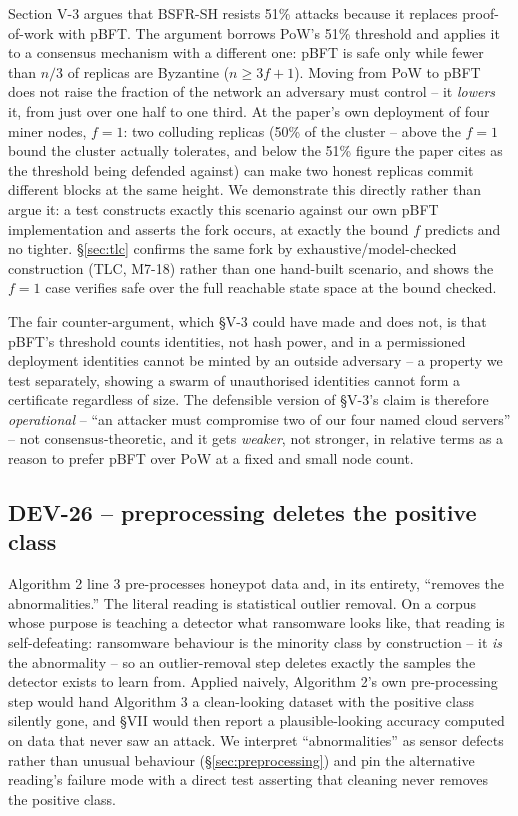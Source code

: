 \documentclass[conference]{IEEEtran}
\begin{document}
Section V-3 argues that BSFR-SH resists 51\% attacks because it replaces proof-of-work with pBFT.
The argument borrows PoW's 51\% threshold and applies it to a consensus mechanism with a
different one: pBFT is safe only while fewer than $n/3$ of replicas are Byzantine
($n\geq3f+1$). Moving from PoW to pBFT does not raise the fraction of the network an adversary
must control -- it \emph{lowers} it, from just over one half to one third. At the paper's own
deployment of four miner nodes, $f=1$: two colluding replicas (50\% of the cluster -- above the
$f=1$ bound the cluster actually tolerates, and below the 51\% figure the paper cites as the
threshold being defended against) can make two honest replicas commit different blocks at the
same height. We demonstrate this directly rather than argue it: a test constructs exactly this
scenario against our own pBFT implementation and asserts the fork occurs, at exactly the bound
$f$ predicts and no tighter. \S\ref{sec:tlc} confirms the same fork by exhaustive/model-checked
construction (TLC, M7-18) rather than one hand-built scenario, and shows the $f=1$ case verifies
safe over the full reachable state space at the bound checked.

The fair counter-argument, which \S V-3 could have made and does not, is that pBFT's threshold
counts identities, not hash power, and in a permissioned deployment identities cannot be minted
by an outside adversary -- a property we test separately, showing a swarm of unauthorised
identities cannot form a certificate regardless of size. The defensible version of \S V-3's claim
is therefore \emph{operational} -- ``an attacker must compromise two of our four named cloud
servers'' -- not consensus-theoretic, and it gets \emph{weaker}, not stronger, in relative terms
as a reason to prefer pBFT over PoW at a fixed and small node count.

\subsection{DEV-26 -- preprocessing deletes the positive class}
\label{sec:flaw-preprocess}

Algorithm 2 line 3 pre-processes honeypot data and, in its entirety, ``removes the
abnormalities.'' The literal reading is statistical outlier removal. On a corpus whose purpose is
teaching a detector what ransomware looks like, that reading is self-defeating: ransomware
behaviour is the minority class by construction -- it \emph{is} the abnormality -- so an
outlier-removal step deletes exactly the samples the detector exists to learn from. Applied
naively, Algorithm 2's own pre-processing step would hand Algorithm 3 a clean-looking dataset
with the positive class silently gone, and \S VII would then report a plausible-looking accuracy
computed on data that never saw an attack. We interpret ``abnormalities'' as sensor defects
rather than unusual behaviour (\S\ref{sec:preprocessing}) and pin the alternative reading's
failure mode with a direct test asserting that cleaning never removes the positive class.
\end{document}
